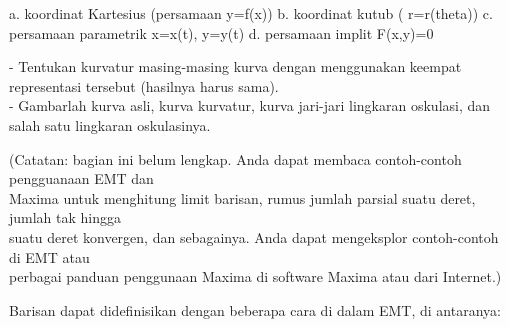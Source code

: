\documentclass[12pt,Times new roman,letterpaper]{book}
\begin{document}
\begin{eulernootebook}
\begin{eulercomment}
\begin{eulercomment}
\begin{eulernootebook}
\begin{eulercomment}
\begin{eulercomment}
\begin{eulercomment}
\begin{eulercomment}
\begin{eulercomment}
\begin{eulercomment}
\begin{eulernotebook}
\begin{eulercomment}
\begin{eulercomment}
\begin{eulercomment}
\begin{eulercomment}
\begin{eulercomment}
\begin{eulercomment}
\begin{eulercomment}
\begin{eulercomment}
\begin{eulercomment}
\begin{eulercomment}
\begin{eulercomment}
\begin{eulercomment}
\begin{eulercomment}
\begin{eulercomment}
\begin{eulercomment}
\begin{eulercomment}
\begin{eulercomment}
\begin{eulercomment}
\begin{eulercomment}
\begin{eulercomment}
\begin{eulercomment}
\begin{eulercomment}
\begin{eulercomment}
\end{eulercomment}
\begin{eulerttcomment}
  a. koordinat Kartesius (persamaan y=f(x))
  b. koordinat kutub ( r=r(theta))
  c. persamaan parametrik x=x(t), y=y(t)
  d. persamaan implit F(x,y)=0
\end{eulerttcomment}
\begin{eulercomment}

- Tentukan kurvatur masing-masing kurva dengan menggunakan keempat
representasi tersebut (hasilnya harus sama).\\
- Gambarlah kurva asli, kurva kurvatur, kurva jari-jari lingkaran
oskulasi, dan salah satu lingkaran oskulasinya.


\begin{eulercomment}
\begin{eulercomment}
(Catatan: bagian ini belum lengkap. Anda dapat membaca contoh-contoh
pengguanaan EMT dan\\
Maxima untuk menghitung limit barisan, rumus jumlah parsial suatu
deret, jumlah tak hingga\\
suatu deret konvergen, dan sebagainya. Anda dapat mengeksplor
contoh-contoh di EMT atau\\
perbagai panduan penggunaan Maxima di software Maxima atau dari
Internet.)

Barisan dapat didefinisikan dengan beberapa cara di dalam EMT, di
antaranya:


\end{eulercomment}
\end{eulercomment}
\end{eulercomment}
\end{eulercomment}
\end{eulercomment}
\end{eulercomment}
\end{eulercomment}
\end{eulercomment}
\end{eulercomment}
\end{eulercomment}
\end{eulercomment}
\end{eulercomment}
\end{eulercomment}
\end{eulercomment}
\end{eulercomment}
\end{eulercomment}
\end{eulercomment}
\end{eulercomment}
\end{eulercomment}
\end{eulercomment}
\end{eulercomment}
\end{eulercomment}
\end{eulercomment}
\end{eulercomment}
\end{eulercomment}
\end{eulernotebook}
\end{eulercomment}
\end{eulercomment}
\end{eulercomment}
\end{eulercomment}
\end{eulercomment}
\end{eulercomment}
\end{eulernootebook}
\end{eulercomment}
\end{eulercomment}
\end{eulernootebook}
\end{document}
